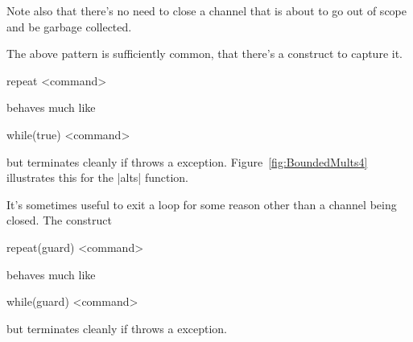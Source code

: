 Note also that there's no need to close a channel that is about to go out of
scope and be garbage collected. 

The above pattern is sufficiently common, that there's a construct to capture
it.
%
\begin{scala}
  repeat{ <command> }
\end{scala}
%
behaves much like
\begin{scala}
  while(true){ <command> }
\end{scala}
but terminates cleanly if  throws a 
exception.
Figure~\ref{fig:BoundedMults4} illustrates this for the |alts| function.


It's sometimes useful to exit a loop for some reason other than a channel
being closed.  The construct
%
\begin{scala}
  repeat(guard){ <command> }
\end{scala}
%
behaves much like
\begin{scala}
  while(guard){ <command> }
\end{scala}
but terminates cleanly if  throws a 
exception.


